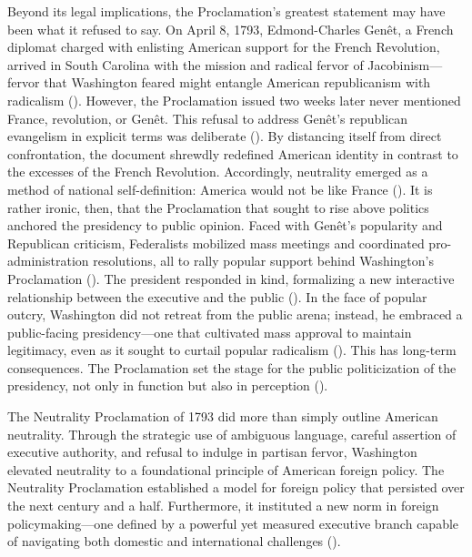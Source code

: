 \documentclass[12pt, a4paper, twoside]{article}
\begin{document}
Beyond its legal implications, the Proclamation’s greatest statement may have been what it refused to say. On April 8, 1793, Edmond-Charles Genêt, a French diplomat charged with enlisting American support for the French Revolution, arrived in South Carolina with the mission and radical fervor of Jacobinism—fervor that Washington feared might entangle American republicanism with radicalism (\cites[p.\ 464]{sheridan1994}[pp.\ 444–445]{mccullough2008}{hamilton1793}). However, the Proclamation issued two weeks later never mentioned France, revolution, or Genêt. This refusal to address Genêt’s republican evangelism in explicit terms was deliberate (\cite{washington1793}). By distancing itself from direct confrontation, the document shrewdly redefined American identity in contrast to the excesses of the French Revolution. Accordingly, neutrality emerged as a method of national self-definition: America would not be like France (\cites[p.\ 470]{sheridan1994}[p.\ 465]{young2011}). It is rather ironic, then, that the Proclamation that sought to rise above politics anchored the presidency to public opinion. Faced with Genêt’s popularity and Republican criticism, Federalists mobilized mass meetings and coordinated pro-administration resolutions, all to rally popular support behind Washington’s Proclamation (\cite[p.\ 454–456]{young2011}). The president responded in kind, formalizing a new interactive relationship between the executive and the public (\cite[pp.\ 437, 456–58, 462]{young2011}). In the face of popular outcry, Washington did not retreat from the public arena; instead, he embraced a public-facing presidency—one that cultivated mass approval to maintain legitimacy, even as it sought to curtail popular radicalism (\cite[p.\ 465]{sheridan1994}). This has long-term consequences. The Proclamation set the stage for the public politicization of the presidency, not only in function but also in perception (\cite[p.\ 435]{young2011}).

The Neutrality Proclamation of 1793 did more than simply outline American neutrality. Through the strategic use of ambiguous language, careful assertion of executive authority, and refusal to indulge in partisan fervor, Washington elevated neutrality to a foundational principle of American foreign policy. The Neutrality Proclamation established a model for foreign policy that persisted over the next century and a half. Furthermore, it instituted a new norm in foreign policymaking—one defined by a powerful yet measured executive branch capable of navigating both domestic and international challenges (\cite[p.\ 107]{reinstein2011}).

\printbibliography
\end{document}
